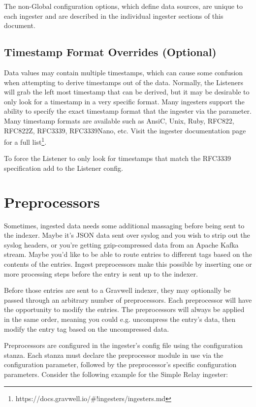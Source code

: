 The non-Global configuration options, which define data sources, are
unique to each ingester and are described in the individual ingester
sections of this document.

\subsection{Timestamp Format Overrides (Optional)}
Data values may contain multiple timestamps, which can cause some
confusion when attempting to derive timestamps out of the data.
Normally, the Listeners will grab the left most timestamp that can be
derived, but it may be desirable to only look for a timestamp in a very
specific format. Many ingesters support the ability to specify the
exact timestamp format that the ingester via the
 parameter. Many timestamp
formats are available such as AnsiC, Unix, Ruby, RFC822, RFC822Z,
RFC3339, RFC3339Nano, etc. Visit the ingester documentation page for a
full list\footnote{https://docs.gravwell.io/\#!ingesters/ingesters.md}.

To force the Listener to only look for timestamps that match the
RFC3339 specification add  to the
Listener config.

\section{Preprocessors}

Sometimes, ingested data needs some additional massaging before being
sent to the indexer.  Maybe it's JSON data sent over syslog and you
wish to strip out the syslog headers, or you're getting gzip-compressed
data from an Apache Kafka stream. Maybe you'd like to be able to route
entries to different tags based on the contents of the entries. Ingest
preprocessors make this possible by inserting one or more processing
steps before the entry is sent up to the indexer.

Before those entries are sent to a Gravwell indexer, they may optionally
be passed through an arbitrary number of preprocessors.
Each preprocessor will have the opportunity to modify the entries. The
preprocessors will always be applied in the same order, meaning you
could e.g. uncompress the entry's data, then modify the entry tag based
on the uncompressed data.

Preprocessors are configured in the ingester's config file using the
 configuration stanza. Each  stanza must declare
the preprocessor module in use via the  configuration parameter,
followed by the preprocessor's specific configuration parameters. Consider
the following example for the Simple Relay ingester:

